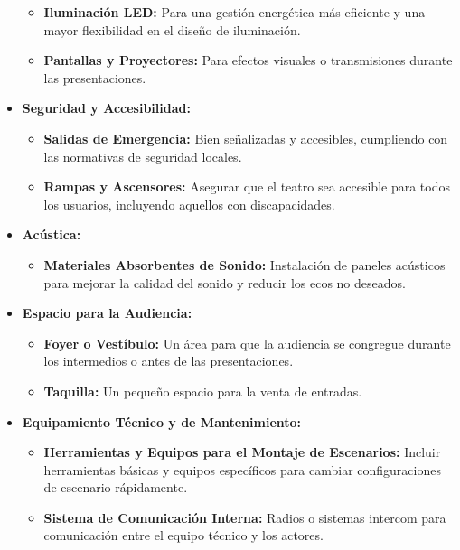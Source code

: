 \begin{itemize}
            \begin{itemize}
                \item \textbf{Iluminación LED:} Para una gestión energética más eficiente y una mayor flexibilidad en el diseño de iluminación.
                \item \textbf{Pantallas y Proyectores:} Para efectos visuales o transmisiones durante las presentaciones.
            \end{itemize}
    \item \textbf{Seguridad y Accesibilidad:}
            \begin{itemize}
                \item \textbf{Salidas de Emergencia:} Bien señalizadas y accesibles, cumpliendo con las normativas de seguridad locales.
                \item \textbf{Rampas y Ascensores:} Asegurar que el teatro sea accesible para todos los usuarios, incluyendo aquellos con discapacidades.
            \end{itemize}
    \item \textbf{Acústica:}
            \begin{itemize}
                \item \textbf{Materiales Absorbentes de Sonido:} Instalación de paneles acústicos para mejorar la calidad del sonido y reducir los ecos no deseados.
            \end{itemize}
    \item \textbf{Espacio para la Audiencia:}
            \begin{itemize}
                \item \textbf{Foyer o Vestíbulo:} Un área para que la audiencia se congregue durante los intermedios o antes de las presentaciones.
                \item \textbf{Taquilla:} Un pequeño espacio para la venta de entradas.
            \end{itemize}
    \item \textbf{Equipamiento Técnico y de Mantenimiento:}
            \begin{itemize}
                \item \textbf{Herramientas y Equipos para el Montaje de Escenarios:} Incluir herramientas básicas y equipos específicos para cambiar configuraciones de escenario rápidamente.
                \item \textbf{Sistema de Comunicación Interna:} Radios o sistemas intercom para comunicación entre el equipo técnico y los actores.
            \end{itemize}
\end{itemize}




